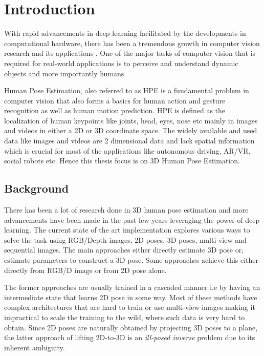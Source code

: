 \chapter{Introduction}
\label{chap:introduction}
With rapid advancements in deep learning facilitated by the developments in computational hardware, there has been a tremendous growth in computer vision research and its applications \cite{AIandCompute}. One of the major tasks of computer vision that is required for real-world applications is to perceive and understand dynamic objects and more importantly humans. 

Human Pose Estimation, also referred to as HPE is a fundamental problem in computer vision that also forms a basics for human action and gesture recognition as well as human motion prediction. \ac{HPE} is defined as the localization of human keypoints like joints, head, eyes, nose etc mainly in images and videos in either a 2D or 3D coordinate space. The widely available and used data like images and videos are 2 dimensional data and lack spatial information which is crucial for most of the applications like autonomous driving, \ac{AR/VR}, social robots etc. Hence this thesis focus is on 3D Human Pose Estimation.



\section{Background}
\label{sec:background}

There has been a lot of research done in 3D human pose estimation and more advancements have been made in the past few years leveraging the power of deep learning. The current state of the art implementation explores various ways to solve the task using \ac{RGB}/Depth images, 2D poses, 3D poses, multi-view and sequential images. The main approaches either directly estimate 3D pose or, estimate parameters to construct a 3D pose. Some approaches achieve this either directly from \ac{RGB}/D image or from 2D pose alone.

The former approaches are usually trained in a cascaded manner i.e by having an intermediate state that learns 2D pose in some way. Most of these methods have complex architectures that are hard to train or use multi-view images making it impractical to scale the training to the wild, where such data is very hard to obtain. Since 2D poses are naturally obtained by projecting 3D poses to a plane, the latter approach of lifting 2D-to-3D is an \textit{ill-posed inverse} problem due to its inherent ambiguity. 

